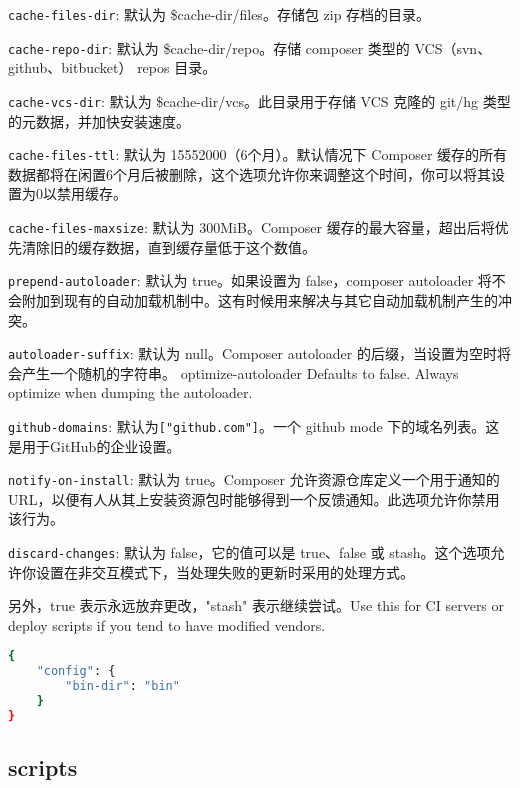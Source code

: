 \begin{compactitem}
\item \texttt{cache-files-dir}: 默认为 \$cache-dir/files。存储包 zip 存档的目录。
\item \texttt{cache-repo-dir}: 默认为 \$cache-dir/repo。存储 composer 类型的 VCS（svn、github、bitbucket） repos 目录。
\item \texttt{cache-vcs-dir}: 默认为 \$cache-dir/vcs。此目录用于存储 VCS 克隆的 git/hg 类型的元数据，并加快安装速度。
\item \texttt{cache-files-ttl}: 默认为 15552000（6个月）。默认情况下 Composer 缓存的所有数据都将在闲置6个月后被删除，这个选项允许你来调整这个时间，你可以将其设置为0以禁用缓存。
\item \texttt{cache-files-maxsize}: 默认为 300MiB。Composer 缓存的最大容量，超出后将优先清除旧的缓存数据，直到缓存量低于这个数值。
\item \texttt{prepend-autoloader}: 默认为 true。如果设置为 false，composer autoloader 将不会附加到现有的自动加载机制中。这有时候用来解决与其它自动加载机制产生的冲突。
\item \texttt{autoloader-suffix}: 默认为 null。Composer autoloader 的后缀，当设置为空时将会产生一个随机的字符串。
optimize-autoloader Defaults to false. Always optimize when dumping the autoloader.
\item \texttt{github-domains}: 默认为\texttt{["github.com"]}。一个 github mode 下的域名列表。这是用于GitHub的企业设置。
\item \texttt{notify-on-install}: 默认为 true。Composer 允许资源仓库定义一个用于通知的 URL，以便有人从其上安装资源包时能够得到一个反馈通知。此选项允许你禁用该行为。
\item \texttt{discard-changes}: 默认为 false，它的值可以是 true、false 或 stash。这个选项允许你设置在非交互模式下，当处理失败的更新时采用的处理方式。

另外，true 表示永远放弃更改，"stash" 表示继续尝试。Use this for CI servers or deploy scripts if you tend to have modified vendors.

\end{compactitem}



\begin{lstlisting}[language=bash]
{
    "config": {
        "bin-dir": "bin"
    }
}
\end{lstlisting}

\subsection{scripts}

